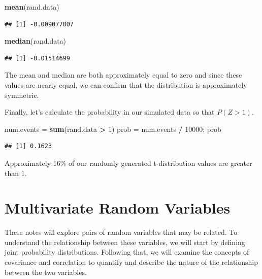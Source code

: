 \documentclass[
  11pt,
  oneside]{book}
\newenvironment{Shaded}{\begin{snugshade}}{\end{snugshade}}
\newcommand{\DecValTok}[1]{\textcolor[rgb]{0.00,0.00,0.81}{#1}}
\newcommand{\FunctionTok}[1]{\textcolor[rgb]{0.13,0.29,0.53}{\textbf{#1}}}
\newcommand{\NormalTok}[1]{#1}
\newcommand{\OtherTok}[1]{\textcolor[rgb]{0.56,0.35,0.01}{#1}}
\newcommand{\SpecialCharTok}[1]{\textcolor[rgb]{0.81,0.36,0.00}{\textbf{#1}}}
\theoremstyle{definition}
\theoremstyle{definition}
\theoremstyle{definition}
\theoremstyle{definition}
\theoremstyle{remark}
\begin{document}
\begin{Shaded}
\begin{Highlighting}[]
\FunctionTok{mean}\NormalTok{(rand.data)}
\end{Highlighting}
\end{Shaded}

\begin{verbatim}
## [1] -0.009077007
\end{verbatim}

\begin{Shaded}
\begin{Highlighting}[]
\FunctionTok{median}\NormalTok{(rand.data)}
\end{Highlighting}
\end{Shaded}

\begin{verbatim}
## [1] -0.01514699
\end{verbatim}

The mean and median are both approximately equal to zero and since these values are nearly equal, we can confirm that the distribution is approximately symmetric.

Finally, let's calculate the probability in our simulated data so that \(P(Z>1)\).

\begin{Shaded}
\begin{Highlighting}[]
\NormalTok{num.events }\OtherTok{=} \FunctionTok{sum}\NormalTok{(rand.data }\SpecialCharTok{\textgreater{}} \DecValTok{1}\NormalTok{)}
\NormalTok{prob }\OtherTok{=}\NormalTok{ num.events }\SpecialCharTok{/} \DecValTok{10000}\NormalTok{; prob}
\end{Highlighting}
\end{Shaded}

\begin{verbatim}
## [1] 0.1623
\end{verbatim}

Approximately 16\% of our randomly generated t-distribution values are greater than 1.

\chapter{Multivariate Random Variables}\label{multivariate-random-variables}

These notes will explore pairs of random variables that may be related. To understand the relationship between these variables, we will start by defining joint probability distributions. Following that, we will examine the concepts of covariance and correlation to quantify and describe the nature of the relationship between the two variables.
\end{document}
